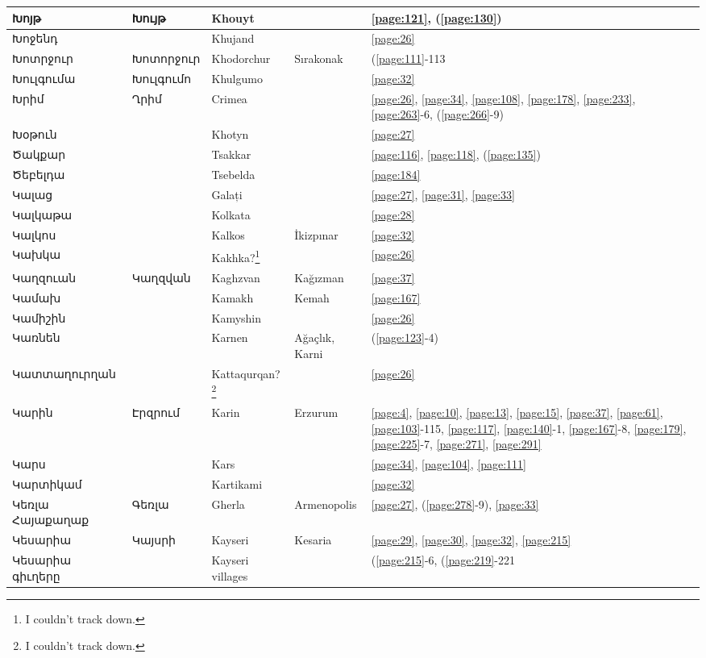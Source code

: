 \begin{center}
\begin{longtable}{|p{}|p{3cm}|p{3cm}|p{2cm}|p{3cm}|}
Խոյթ&Խույթ &Khouyt & &\ref{page:121}, (\ref{page:130})\\ \hline
Խոջենդ& &Khujand & &\ref{page:26}\\ \hline
Խոտրջուր& Խոտորջուր& Khodorchur&Sırakonak &(\ref{page:111}-113\\ \hline
Խուլգումա&   Խուլգումո &Khulgumo & &\ref{page:32}\\ \hline
Խրիմ&Ղրիմ &Crimea & &\ref{page:26}, \ref{page:34}, \ref{page:108}, \ref{page:178}, \ref{page:233}, \ref{page:263}-6, (\ref{page:266}-9)\\ \hline
Խօթուն& & Khotyn& &\ref{page:27}\\ \hline
Ծակքար& & Tsakkar& &\ref{page:116}, \ref{page:118}, (\ref{page:135})\\ \hline
Ծեբելդա& &Tsebelda & &\ref{page:184}\\ \hline
Կալաց& &Galați & &\ref{page:27}, \ref{page:31}, \ref{page:33}\\ \hline
Կալկաթա& &Kolkata & &\ref{page:28}\\ \hline
Կալկոս& &Kalkos &İkizpınar &\ref{page:32}\\ \hline
Կախկա& & Kakhka?\footnote{I couldn't track down.}& &\ref{page:26}\\ \hline
Կաղզուան& Կաղզվան&Kaghzvan  & Kağızman&\ref{page:37}\\ \hline
Կամախ& &Kamakh  & Kemah&\ref{page:167}\\ \hline
Կամիշին& & Kamyshin& &\ref{page:26}\\ \hline
Կառնեն& &  Karnen  & Ağaçlık, Karni&(\ref{page:123}-4)\\ \hline
Կատտաղուրղան& &Kattaqurqan?\footnote{I couldn't track down.} & &\ref{page:26}\\ \hline
Կարին& Էրզրում& 
Karin & Erzurum&\ref{page:4}, \ref{page:10}, \ref{page:13}, \ref{page:15}, \ref{page:37}, \ref{page:61}, \ref{page:103}-115, \ref{page:117}, \ref{page:140}-1, \ref{page:167}-8, \ref{page:179}, \ref{page:225}-7, \ref{page:271}, \ref{page:291}\\ \hline
Կարս& &Kars & &\ref{page:34}, \ref{page:104}, \ref{page:111}\\ \hline
Կարտիկամ& & Kartikami & &\ref{page:32}\\ \hline
Կեռլա Հայաքաղաք&Գեռլա &Gherla &Armenopolis &\ref{page:27}, (\ref{page:278}-9), \ref{page:33}\\ \hline
Կեսարիա&Կայսրի & Kayseri  &Kesaria &\ref{page:29}, \ref{page:30}, \ref{page:32}, \ref{page:215}\\ \hline
Կեսարիա գիւղերը& &Kayseri villages & &(\ref{page:215}-6, (\ref{page:219}-221\\ \hline

\end{longtable}
\end{center}
